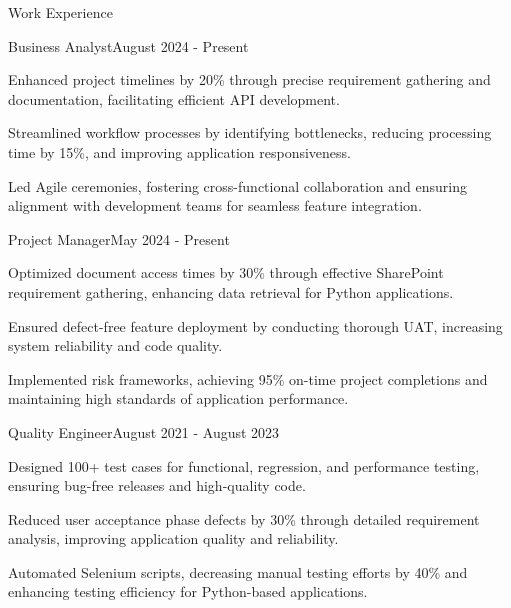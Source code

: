 \documentclass{resume} %
\begin{document}
    \begin{rSection}{Work Experience}
                    \begin{rSubsection}
                {Business Analyst}{August 2024 - Present}
                                    {}
                                {}
                                    \item Enhanced project timelines by 20\% through precise requirement gathering and documentation, facilitating efficient API development.
                                    \item Streamlined workflow processes by identifying bottlenecks, reducing processing time by 15\%, and improving application responsiveness.
                                    \item Led Agile ceremonies, fostering cross{-}functional collaboration and ensuring alignment with development teams for seamless feature integration.
                            \end{rSubsection}
                    \begin{rSubsection}
                {Project Manager}{May 2024 - Present}
                                    {}
                                {}
                                    \item Optimized document access times by 30\% through effective SharePoint requirement gathering, enhancing data retrieval for Python applications.
                                    \item Ensured defect{-}free feature deployment by conducting thorough UAT, increasing system reliability and code quality.
                                    \item Implemented risk frameworks, achieving 95\% on{-}time project completions and maintaining high standards of application performance.
                            \end{rSubsection}
                    \begin{rSubsection}
                {Quality Engineer}{August 2021 - August 2023}
                                    {}
                                {}
                                    \item Designed 100+ test cases for functional, regression, and performance testing, ensuring bug{-}free releases and high{-}quality code.
                                    \item Reduced user acceptance phase defects by 30\% through detailed requirement analysis, improving application quality and reliability.
                                    \item Automated Selenium scripts, decreasing manual testing efforts by 40\% and enhancing testing efficiency for Python{-}based applications.
                            \end{rSubsection}
            \end{rSection}
\end{document}
